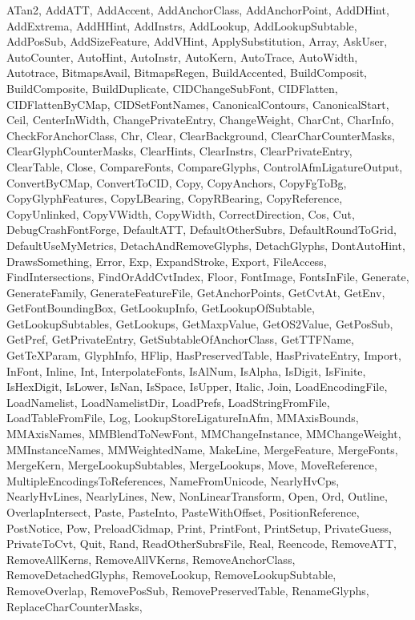 \documentclass[11pt]{report}
\begin{document}
ATan2,
AddATT,
AddAccent,
AddAnchorClass,
AddAnchorPoint,
AddDHint,
AddExtrema,
AddHHint,
AddInstrs,
AddLookup,
AddLookupSubtable,
AddPosSub,
AddSizeFeature,
AddVHint,
ApplySubstitution,
Array,
AskUser,
AutoCounter,
AutoHint,
AutoInstr,
AutoKern,
AutoTrace,
AutoWidth,
Autotrace,
BitmapsAvail,
BitmapsRegen,
BuildAccented,
BuildComposit,
BuildComposite,
BuildDuplicate,
CIDChangeSubFont,
CIDFlatten,
CIDFlattenByCMap,
CIDSetFontNames,
CanonicalContours,
CanonicalStart,
Ceil,
CenterInWidth,
ChangePrivateEntry,
ChangeWeight,
CharCnt,
CharInfo,
CheckForAnchorClass,
Chr,
Clear,
ClearBackground,
ClearCharCounterMasks,
ClearGlyphCounterMasks,
ClearHints,
ClearInstrs,
ClearPrivateEntry,
ClearTable,
Close,
CompareFonts,
CompareGlyphs,
ControlAfmLigatureOutput,
ConvertByCMap,
ConvertToCID,
Copy,
CopyAnchors,
CopyFgToBg,
CopyGlyphFeatures,
CopyLBearing,
CopyRBearing,
CopyReference,
CopyUnlinked,
CopyVWidth,
CopyWidth,
CorrectDirection,
Cos,
Cut,
DebugCrashFontForge,
DefaultATT,
DefaultOtherSubrs,
DefaultRoundToGrid,
DefaultUseMyMetrics,
DetachAndRemoveGlyphs,
DetachGlyphs,
DontAutoHint,
DrawsSomething,
Error,
Exp,
ExpandStroke,
Export,
FileAccess,
FindIntersections,
FindOrAddCvtIndex,
Floor,
FontImage,
FontsInFile,
Generate,
GenerateFamily,
GenerateFeatureFile,
GetAnchorPoints,
GetCvtAt,
GetEnv,
GetFontBoundingBox,
GetLookupInfo,
GetLookupOfSubtable,
GetLookupSubtables,
GetLookups,
GetMaxpValue,
GetOS2Value,
GetPosSub,
GetPref,
GetPrivateEntry,
GetSubtableOfAnchorClass,
GetTTFName,
GetTeXParam,
GlyphInfo,
HFlip,
HasPreservedTable,
HasPrivateEntry,
Import,
InFont,
Inline,
Int,
InterpolateFonts,
IsAlNum,
IsAlpha,
IsDigit,
IsFinite,
IsHexDigit,
IsLower,
IsNan,
IsSpace,
IsUpper,
Italic,
Join,
LoadEncodingFile,
LoadNamelist,
LoadNamelistDir,
LoadPrefs,
LoadStringFromFile,
LoadTableFromFile,
Log,
LookupStoreLigatureInAfm,
MMAxisBounds,
MMAxisNames,
MMBlendToNewFont,
MMChangeInstance,
MMChangeWeight,
MMInstanceNames,
MMWeightedName,
MakeLine,
MergeFeature,
MergeFonts,
MergeKern,
MergeLookupSubtables,
MergeLookups,
Move,
MoveReference,
MultipleEncodingsToReferences,
NameFromUnicode,
NearlyHvCps,
NearlyHvLines,
NearlyLines,
New,
NonLinearTransform,
Open,
Ord,
Outline,
OverlapIntersect,
Paste,
PasteInto,
PasteWithOffset,
PositionReference,
PostNotice,
Pow,
PreloadCidmap,
Print,
PrintFont,
PrintSetup,
PrivateGuess,
PrivateToCvt,
Quit,
Rand,
ReadOtherSubrsFile,
Real,
Reencode,
RemoveATT,
RemoveAllKerns,
RemoveAllVKerns,
RemoveAnchorClass,
RemoveDetachedGlyphs,
RemoveLookup,
RemoveLookupSubtable,
RemoveOverlap,
RemovePosSub,
RemovePreservedTable,
RenameGlyphs,
ReplaceCharCounterMasks,
\end{document}
